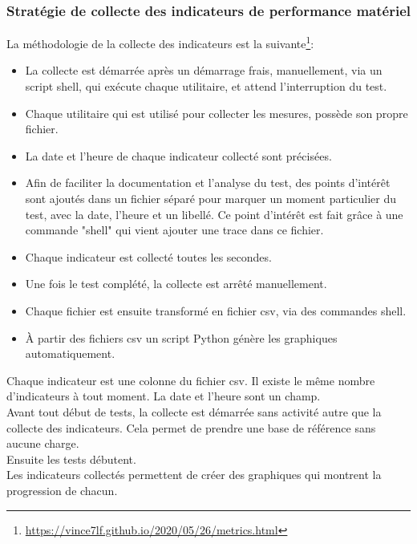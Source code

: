 \subsubsection{Stratégie de collecte des indicateurs de performance matériel}
\noindent La méthodologie de la collecte des indicateurs est la suivante\footnote{\url{https://vince7lf.github.io/2020/05/26/metrics.html}}: 
\begin{itemize}    
    \item La collecte est démarrée après un démarrage frais, manuellement, via un script shell, qui exécute chaque utilitaire, et attend l'interruption du test. 
    \item Chaque utilitaire qui est utilisé pour collecter les mesures, possède son propre fichier.
    \item La date et l'heure de chaque indicateur collecté sont précisées.
    \item Afin de faciliter la documentation et l'analyse du test, des points d'intérêt sont ajoutés dans un fichier séparé pour marquer un moment particulier du test, avec la date, l'heure et un libellé. Ce point d'intérêt est fait grâce à une commande "shell" qui vient ajouter une trace dans ce fichier.
    \item Chaque indicateur est collecté toutes les secondes.  
    \item Une fois le test complété, la collecte est arrêté manuellement. 
    \item Chaque fichier est ensuite transformé en fichier \acrshort{csv}, via des commandes shell.
    \item À partir des fichiers \acrshort{csv} un script Python génère les graphiques automatiquement. 
\end{itemize}
\vspace{\baselineskip}
\noindent Chaque indicateur est une colonne du fichier \acrshort{csv}. Il existe le même nombre d'indicateurs à tout moment. La date et l'heure sont un champ. 
\vspace{\baselineskip}
\\
\noindent Avant tout début de tests, la collecte est démarrée sans activité autre que la collecte des indicateurs. Cela permet de prendre une base de référence sans aucune charge.
\vspace{\baselineskip}
\\
\noindent Ensuite les tests débutent. 
\vspace{\baselineskip}
\\
\noindent Les indicateurs collectés permettent de créer des graphiques qui montrent la progression de chacun.
